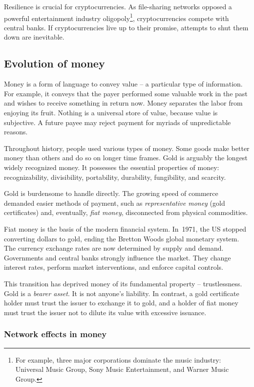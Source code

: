 Resilience is crucial for cryptocurrencies.
As file-sharing networks opposed a powerful entertainment industry oligopoly\footnote{For example, three major corporations dominate the music industry: Universal Music Group, Sony Music Entertainment, and Warner Music Group.}, cryptocurrencies compete with central banks.
If cryptocurrencies live up to their promise, attempts to shut them down are inevitable.


\subsection{Evolution of money}

Money is a form of language to convey value -- a particular type of information.
For example, it conveys that the payer performed some valuable work in the past and wishes to receive something in return now.
Money separates the labor from enjoying its fruit.
Nothing is a universal store of value, because value is subjective.
A future payee may reject payment for myriads of unpredictable reasons.

Throughout history, people used various types of money.
Some goods make better money than others and do so on longer time frames.
Gold is arguably the longest widely recognized money.
It possesses the essential properties of money: recognizability, divisibility, portability, durability, fungibility, and scarcity.

Gold is burdensome to handle directly.
The growing speed of commerce demanded easier methods of payment, such as \textit{representative money} (gold certificates) and, eventually, \textit{fiat money}, disconnected from physical commodities.

Fiat money is the basis of the modern financial system.
In~1971, the US stopped converting dollars to gold, ending the Bretton Woods global monetary system.
The currency exchange rates are now determined by supply and demand.
Governments and central banks strongly influence the market.
They change interest rates, perform market interventions, and enforce capital controls.

This transition has deprived money of its fundamental property -- trustlessness.
Gold is a \textit{bearer asset}.
It is not anyone's liability.
In contrast, a gold certificate holder must trust the issuer to exchange it to gold, and a holder of fiat money must trust the issuer not to dilute its value with excessive issuance.


\subsubsection*{Network effects in money}

